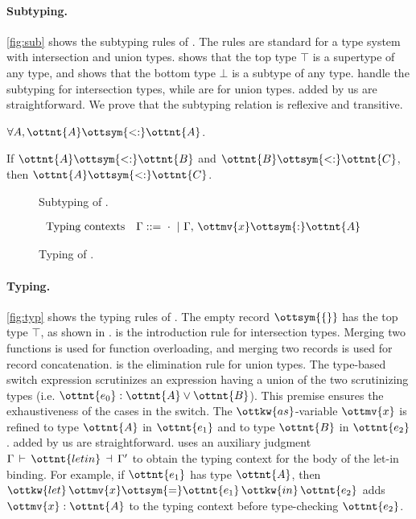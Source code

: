 \paragraph{Subtyping.}
\autoref{fig:sub} shows the subtyping rules of \lambdaiu. The rules are standard
for a type system with intersection and union types.  shows that
the top type $ \top $ is a supertype of any type, and  shows that
the bottom type $ \bot $ is a subtype of any type.
 handle the subtyping for intersection types,
while  are for union types. 
added by us are straightforward. We prove that the subtyping relation is
reflexive and transitive.

\begin{theorem}
  $\forall A, \ottnt{A}  \ottsym{<:}  \ottnt{A}$.
\end{theorem}
\begin{theorem}
  If $\ottnt{A}  \ottsym{<:}  \ottnt{B}$ and $\ottnt{B}  \ottsym{<:}  \ottnt{C}$, then $\ottnt{A}  \ottsym{<:}  \ottnt{C}$.
\end{theorem}

\begin{figure}[b!]
\IUdefnsub{}
\caption{Subtyping of \lambdaiu.} \label{fig:sub}
\end{figure}

\begin{figure}
\begin{align*}
  &\text{Typing contexts}&\Gamma ::=&~  \cdot  ~|~ \Gamma  ,\,  \ottmv{x}  \ottsym{:}  \ottnt{A}
\end{align*}
\IUdefntyping{}
\IUdefnletbind{}
\caption{Typing of \lambdaiu.} \label{fig:typ}
\end{figure}

\paragraph{Typing.}
\autoref{fig:typ} shows the typing rules of \lambdaiu. The empty record $\ottsym{\{\}}$
has the top type $ \top $, as shown in .  is the
introduction rule for intersection types. Merging two functions is used for
function overloading, and merging two records is used for record concatenation.
 is the elimination rule for union types. The type-based switch
expression scrutinizes an expression having a union of the two scrutinizing
types (i.e. $\ottnt{e_{{\mathrm{0}}}}:\ottnt{A}  \lor  \ottnt{B}$). This premise ensures the exhaustiveness of the
cases in the switch. The $\ottkw{as}$-variable $\ottmv{x}$ is refined to type
$\ottnt{A}$ in $\ottnt{e_{{\mathrm{1}}}}$ and to type $\ottnt{B}$ in $\ottnt{e_{{\mathrm{2}}}}$.
 added by us are straightforward. 
uses an auxiliary judgment $\Gamma  \,\vdash\,  \ottnt{letin}  \,\dashv\,  \Gamma'$ to obtain the typing context
for the body of the let-in binding. For example, if $\ottnt{e_{{\mathrm{1}}}}$ has type $\ottnt{A}$,
then $\ottkw{let} \, \ottmv{x}  \ottsym{=}  \ottnt{e_{{\mathrm{1}}}} \, \ottkw{in} \, \ottnt{e_{{\mathrm{2}}}}$ adds $\ottmv{x}:\ottnt{A}$ to the typing context before
type-checking $\ottnt{e_{{\mathrm{2}}}}$.

